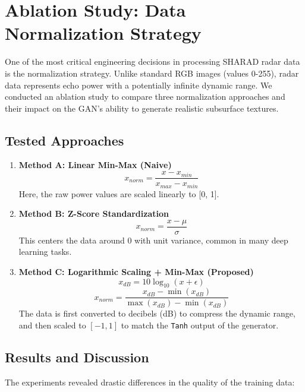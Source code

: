 \section{Ablation Study: Data Normalization Strategy}
\label{sec:ablation_normalization}

One of the most critical engineering decisions in processing SHARAD radar data is the normalization strategy.
Unlike standard RGB images (values 0-255), radar data represents echo power with a potentially infinite dynamic range.
We conducted an ablation study to compare three normalization approaches and their impact on the GAN's ability to generate realistic subsurface textures.

\subsection{Tested Approaches}
\begin{enumerate}
    \item \textbf{Method A: Linear Min-Max (Naive)}
    $$ x_{norm} = \frac{x - x_{min}}{x_{max} - x_{min}} $$
    Here, the raw power values are scaled linearly to [0, 1].
    
    \item \textbf{Method B: Z-Score Standardization}
    $$ x_{norm} = \frac{x - \mu}{\sigma} $$
    This centers the data around 0 with unit variance, common in many deep learning tasks.
    
    \item \textbf{Method C: Logarithmic Scaling + Min-Max (Proposed)}
    $$ x_{dB} = 10 \log_{10}(x + \epsilon) $$
    $$ x_{norm} = \frac{x_{dB} - \min(x_{dB})}{\max(x_{dB}) - \min(x_{dB})} $$
    The data is first converted to decibels (dB) to compress the dynamic range, and then scaled to $[-1, 1]$ to match the \texttt{Tanh} output of the generator.
\end{enumerate}

\subsection{Results and Discussion}
The experiments revealed drastic differences in the quality of the training data:

